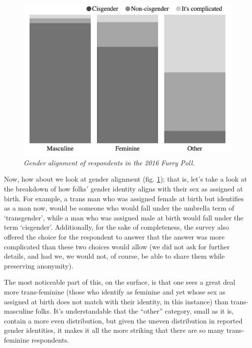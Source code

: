 \begin{figure}
  \centering
  \includegraphics[scale=0.45]{assets/alignment.png}
  \caption{\textit{Gender alignment of respondents in the 2016 Furry Poll.}}
  \label{fig:alignment}
\end{figure}

Now, how about we look at gender alignment (fig. \ref{fig:alignment}); that is, let's take a look at the breakdown of how folks' gender identity aligns with their sex as assigned at birth. For example, a trans man who was assigned female at birth but identifies as a man now, would be someone who would fall under the umbrella term of `transgender', while a man who was assigned male at birth would fall under the term `cisgender'. Additionally, for the sake of completeness, the survey also offered the choice for the respondent to answer that the answer was more complicated than these two choices would allow (we did not ask for further details, and had we, we would not, of course, be able to share them while preserving anonymity).

The most noticeable part of this, on the surface, is that one sees a great deal more trans-feminine (those who identify as feminine and yet whose sex as assigned at birth does not match with their identity, in this instance) than trans-masculine folks. It's understandable that the ``other'' category, small as it is, contain a more even distribution, but given the uneven distribution in reported gender identities, it makes it all the more striking that there are so many trans-feminine respondents.


